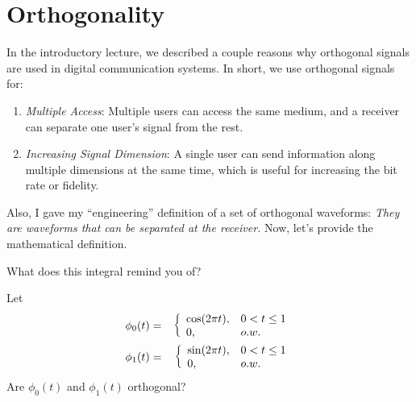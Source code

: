 \section{Orthogonality}
In the introductory lecture, we described a couple reasons why orthogonal signals are used in digital communication systems.  In short, we use orthogonal signals for:
\begin{enumerate}
 \item \emph{Multiple Access}: Multiple users can access the same medium, and a receiver can separate one user's signal from the rest.
 \item \emph{Increasing Signal Dimension}: A single user can send information along multiple dimensions at the same time, which is useful for increasing the bit rate or fidelity.
\end{enumerate}

Also, I gave  my ``engineering'' definition of a set of orthogonal waveforms:  \emph{They are waveforms that can be separated at the receiver.}  Now, let's provide the mathematical definition.


What does this integral remind you of?


 Let
\begin{eqnarray}
 \phi_0(t) &=& { \left\{\begin{array}{ll} {\cos(2\pi t)}, & {0< t \le 1} \\ 0, & o.w. \end{array}\right. } \nonumber \\
 \phi_1(t) &=& { \left\{\begin{array}{ll} {\sin(2\pi t)}, & {0< t \le 1} \\ 0, & o.w. \end{array}\right. } \nonumber
\end{eqnarray}
Are $\phi_0(t)$ and $\phi_1(t)$ orthogonal?


